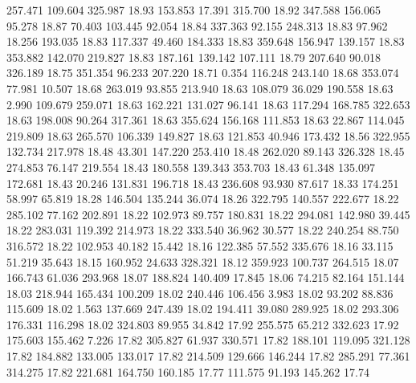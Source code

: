  257.471  109.604  325.987        18.93
 153.853   17.391  315.700        18.92
 347.588  156.065   95.278        18.87
  70.403  103.445   92.054        18.84
 337.363   92.155  248.313        18.83
  97.962   18.256  193.035        18.83
 117.337   49.460  184.333        18.83
 359.648  156.947  139.157        18.83
 353.882  142.070  219.827        18.83
 187.161  139.142  107.111        18.79
 207.640   90.018  326.189        18.75
 351.354   96.233  207.220        18.71
   0.354  116.248  243.140        18.68
 353.074   77.981   10.507        18.68
 263.019   93.855  213.940        18.63
 108.079   36.029  190.558        18.63
   2.990  109.679  259.071        18.63
 162.221  131.027   96.141        18.63
 117.294  168.785  322.653        18.63
 198.008   90.264  317.361        18.63
 355.624  156.168  111.853        18.63
  22.867  114.045  219.809        18.63
 265.570  106.339  149.827        18.63
 121.853   40.946  173.432        18.56
 322.955  132.734  217.978        18.48
  43.301  147.220  253.410        18.48
 262.020   89.143  326.328        18.45
 274.853   76.147  219.554        18.43
 180.558  139.343  353.703        18.43
  61.348  135.097  172.681        18.43
  20.246  131.831  196.718        18.43
 236.608   93.930   87.617        18.33
 174.251   58.997   65.819        18.28
 146.504  135.244   36.074        18.26
 322.795  140.557  222.677        18.22
 285.102   77.162  202.891        18.22
 102.973   89.757  180.831        18.22
 294.081  142.980   39.445        18.22
 283.031  119.392  214.973        18.22
 333.540   36.962   30.577        18.22
 240.254   88.750  316.572        18.22
 102.953   40.182   15.442        18.16
 122.385   57.552  335.676        18.16
  33.115   51.219   35.643        18.15
 160.952   24.633  328.321        18.12
 359.923  100.737  264.515        18.07
 166.743   61.036  293.968        18.07
 188.824  140.409   17.845        18.06
  74.215   82.164  151.144        18.03
 218.944  165.434  100.209        18.02
 240.446  106.456    3.983        18.02
  93.202   88.836  115.609        18.02
   1.563  137.669  247.439        18.02
 194.411   39.080  289.925        18.02
 293.306  176.331  116.298        18.02
 324.803   89.955   34.842        17.92
 255.575   65.212  332.623        17.92
 175.603  155.462    7.226        17.82
 305.827   61.937  330.571        17.82
 188.101  119.095  321.128        17.82
 184.882  133.005  133.017        17.82
 214.509  129.666  146.244        17.82
 285.291   77.361  314.275        17.82
 221.681  164.750  160.185        17.77
 111.575   91.193  145.262        17.74
